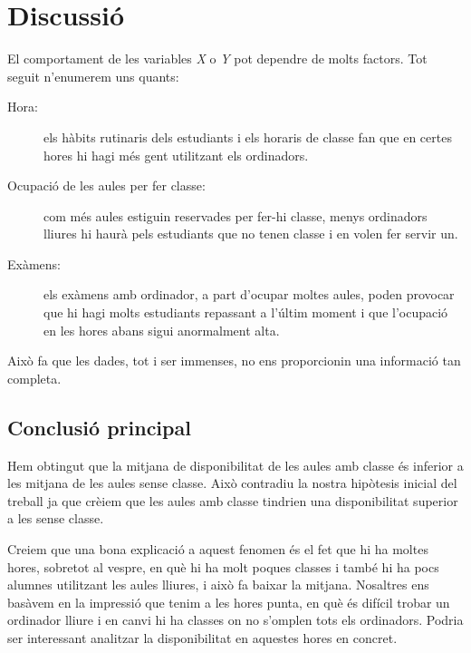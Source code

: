 \section{Discussió}
El comportament de les variables \emph{X} o \emph{Y} pot dependre de molts factors. Tot seguit n'enumerem uns quants:
\begin{description}
	\item[Hora:] els hàbits rutinaris dels estudiants i els horaris de classe fan que en certes hores hi hagi més gent utilitzant els ordinadors.
	\item[Ocupació de les aules per fer classe:] com més aules estiguin reservades per fer-hi classe, menys ordinadors lliures hi haurà pels estudiants que no tenen classe i en volen fer servir un.
	\item[Exàmens:] els exàmens amb ordinador, a part d'ocupar moltes aules, poden provocar que hi hagi molts estudiants repassant a l'últim moment i que l'ocupació en les hores abans sigui anormalment alta.
\end{description}
Això fa que les dades, tot i ser immenses, no ens proporcionin una informació tan completa.

\subsection{Conclusió principal}
Hem obtingut que la mitjana de disponibilitat de les aules amb classe és inferior a les mitjana de les aules sense classe. Això contradiu la nostra hipòtesis inicial del treball ja que crèiem que les aules amb classe tindrien una disponibilitat superior a les sense classe. 

Creiem que una bona explicació a aquest fenomen és el fet que hi ha moltes hores, sobretot al vespre, en què hi ha molt poques classes i també hi ha pocs alumnes utilitzant les aules lliures, i això fa baixar la mitjana. Nosaltres ens basàvem en la impressió que tenim a les hores punta, en què és difícil trobar un ordinador lliure i en canvi hi ha classes on no s'omplen tots els ordinadors. Podria ser interessant analitzar la disponibilitat en aquestes hores en concret.
